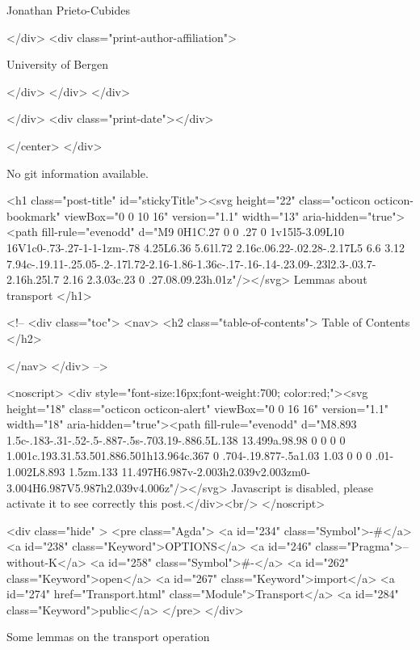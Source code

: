                   Jonathan Prieto-Cubides
                
              </div>
              <div class="print-author-affiliation">
                
                  University of Bergen
                
                </div>
            </div>
          </div>
          
          
        </div>
        <div class="print-date"></div>
        
        
    </center>
  </div>

  
  No git information available.
  
  <h1 class="post-title" id="stickyTitle"><svg height="22" class="octicon octicon-bookmark" viewBox="0 0 10 16" version="1.1" width="13" aria-hidden="true"><path fill-rule="evenodd" d="M9 0H1C.27 0 0 .27 0 1v15l5-3.09L10 16V1c0-.73-.27-1-1-1zm-.78 4.25L6.36 5.61l.72 2.16c.06.22-.02.28-.2.17L5 6.6 3.12 7.94c-.19.11-.25.05-.2-.17l.72-2.16-1.86-1.36c-.17-.16-.14-.23.09-.23l2.3-.03.7-2.16h.25l.7 2.16 2.3.03c.23 0 .27.08.09.23h.01z"/></svg> Lemmas about transport 
  </h1>

  <!-- 
  <div class="toc">
    <nav>
    <h2 class="table-of-contents"> Table of Contents </h2>
      

    </nav>
  </div>
   -->

  <noscript>
  <div style="font-size:16px;font-weight:700; color:red;"><svg height="18" class="octicon octicon-alert" viewBox="0 0 16 16" version="1.1" width="18" aria-hidden="true"><path fill-rule="evenodd" d="M8.893 1.5c-.183-.31-.52-.5-.887-.5s-.703.19-.886.5L.138 13.499a.98.98 0 0 0 0 1.001c.193.31.53.501.886.501h13.964c.367 0 .704-.19.877-.5a1.03 1.03 0 0 0 .01-1.002L8.893 1.5zm.133 11.497H6.987v-2.003h2.039v2.003zm0-3.004H6.987V5.987h2.039v4.006z"/></svg> Javascript is disabled, please activate it to see correctly this post.</div><br/>
  </noscript>

  <div class="hide" >
<pre class="Agda">
<a id="234" class="Symbol">{-#</a> <a id="238" class="Keyword">OPTIONS</a> <a id="246" class="Pragma">--without-K</a> <a id="258" class="Symbol">#-}</a>
<a id="262" class="Keyword">open</a> <a id="267" class="Keyword">import</a> <a id="274" href="Transport.html" class="Module">Transport</a> <a id="284" class="Keyword">public</a>
</pre>
</div>

Some lemmas on the transport operation

